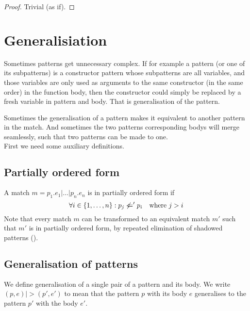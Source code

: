\begin{proof}
  Trivial (as if).
\end{proof}

\section{Generalisiation}
Sometimes patterns get unnecessary complex. If for example a pattern (or one of
its subpatterns) is a constructor pattern whose subpatterns are all variables,
and those variables are only used as arguments to the same constructor (in the
same order) in the function body, then the constructor could simply be replaced
by a fresh variable in pattern and body. That is generalisation of the pattern.

Sometimes the generalisation of a pattern makes it equivalent to another pattern
in the match. And sometimes the two patterns corresponding bodys will merge
seamlessly, such that two patterns can be made to one.
\\[1em]
First we need some auxiliary definitions.

\subsection{Partially ordered form}
\begin{definition}\label{def:part-order-form}
  A match $m = p_1\texttt{.}e_1\texttt{|}\ldots\texttt{|}p_n\texttt{.}e_n$ is in
  partially ordered form if
  \[
  \forall i \in \{1, \ldots, n\} : p_j \not <=' p_i \quad \textnormal{where $j > i$}
  \]
  Note that every match $m$ can be transformed to an equivalent match $m'$ such
  that $m'$ is in partially ordered form, by repeated elimination of shadowed
  patterns ().
\end{definition}

\subsection{Generalisation of patterns}
We define generalisation of a single pair of a pattern and its body. We write
$(p, e) |> (p', e')$ to mean that the pattern $p$ with its body $e$ generalises
to the pattern $p'$ with the body $e'$.

